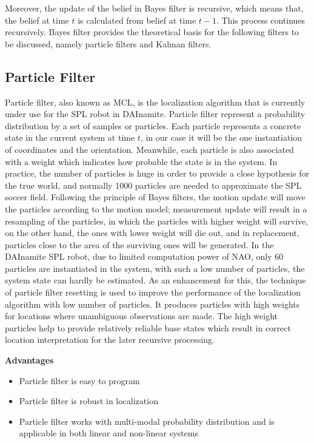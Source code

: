 Moreover, the update of the belief in Bayes filter is recursive, which means that, the belief at time $t$ is calculated from belief at time $t-1$. This process continues recursively. Bayes filter provides the theoretical basis for the following filters to be discussed, namely particle filters and Kalman filters. 

\subsection{Particle Filter}
Particle filter, also known as \gls{MCL}, is the localization algorithm that is currently under use for the \gls{SPL} robot in DAInamite. Particle filter represent a probability distribution by a set of samples or particles. Each particle represents a concrete state in the current system at time $t$, in our case it will be the one instantiation of coordinates and the orientation. Meanwhile, each particle is also associated with a weight which indicates how probable the state is in the system. In practice, the number of particles is huge in order to provide a close hypothesis for the true world, and normally 1000 particles are needed to approximate the \gls{SPL} soccer field. Following the principle of Bayes filters, the motion update will move the particles according to the motion model; measurement update will result in a resampling of the particles, in which the particles with higher weight will survive, on the other hand, the ones with lower weight will die out, and in replacement, particles close to the area of the surviving ones will be generated. In the DAInamite \gls{SPL} robot, due to limited computation power of NAO, only 60 particles are instantiated in the system, with such a low number of particles, the system state can hardly be estimated. As an enhancement for this, the technique of particle filter resetting is used to improve the performance of the localization algorithm with low number of particles. It produces particles with high weights for locations where unambiguous observations are made. The high weight particles help to provide relatively reliable base states which result in correct location interpretation for the later recursive processing. 

\noindent\textbf{Advantages}
\begin{itemize}
  \item  Particle filter is easy to program
  \item Particle filter is robust in localization 
  \item  Particle filter works with multi-modal probability distribution and is applicable in both linear and non-linear systems
\end{itemize}

